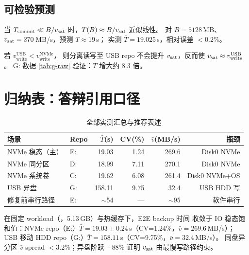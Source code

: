 \subsection{可检验预测}

\begin{proposition}[线性缩放（$B$ 增大）]
\label{prop:scaling}
当 $T_{\mathrm{commit}} \ll B/v_{\mathrm{sat}}$ 时，$T(B)\approx B/v_{\mathrm{sat}}$ 近似线性。
对 $B=5128$\,MB、$v_{\mathrm{sat}}=270$\,MB/s，预测 $T\approx 19$\,s；
实测 $\bar{T}=19.025$\,s，相对误差 $<0.2\%$。
\end{proposition}

\begin{proposition}[异盘不会自动加速]
\label{prop:no-free-lunch}
若 $v_{\mathrm{write}}^{\mathrm{USB}} < v_{\mathrm{write}}^{\mathrm{NVMe}}$，
则分离读写至 USB repo 不会提升 $v_{\mathrm{sat}}$，反而使
$v_{\mathrm{sat}}\approx v_{\mathrm{write}}^{\mathrm{USB}}$。
G: 数据 \cref{tab:g-raw} 验证：$T$ 增大约 8.3 倍。
\end{proposition}

\section{归纳表：答辩引用口径}\label{sec:summary-table}

\begin{table}[htbp]
\centering
\caption{全部实测汇总与推荐表述}
\label{tab:master}
\small
\begin{tabular}{@{}llrrrr@{}}
\toprule
场景 & Repo & $\bar{T}$(s) & CV(\%) & $\bar{v}$(MB/s) & 瓶颈 \\
\midrule
NVMe 稳态（主） & E: & 19.03 & 1.24 & 269.6 & Disk0 NVMe \\
NVMe 同分区 & D: & 18.99 & 7.11 & 270.1 & Disk0 NVMe \\
NVMe 系统卷 & C: & 19.62 & 6.08 & 261.4 & Disk0 NVMe+OS \\
USB 异盘 & G: & 158.11 & 9.75 & 32.4 & USB HDD 写 \\
修复前串行路径 & E: & $\sim$54 & — & $\sim$95 & 软件串行 \\
\bottomrule
\end{tabular}
\end{table}

\begin{databox}[推荐答辩句]
在固定 workload（，5.13\,GB）与热缓存下，E2E backup 时间
收敛于 IO 稳态饱和值：NVMe repo（E:）$\bar{T}=19.03\pm0.24$\,s（CV=1.24\%，$\bar{v}=269.6$\,MB/s）；
USB 移动 HDD repo（G:）$\bar{T}=158.11$\,s（CV=9.75\%，$\bar{v}=32.4$\,MB/s）。
同盘异分区 $\bar{v}$ spread $<3.2\%$；异盘阶跃 $-88\%$ 证明 $v_{\mathrm{sat}}$ 由最慢写路径约束。
\end{databox}
